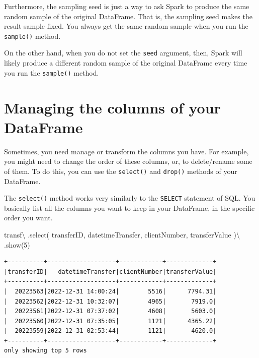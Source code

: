 \documentclass[
  11pt,
  letterpaper,
  DIV=11,
  numbers=noendperiod]{scrreprt}
\newenvironment{Shaded}{\begin{snugshade}}{\end{snugshade}}
\newcommand{\DecValTok}[1]{\textcolor[rgb]{0.68,0.00,0.00}{#1}}
\newcommand{\NormalTok}[1]{\textcolor[rgb]{0.00,0.23,0.31}{#1}}
\newcommand{\OperatorTok}[1]{\textcolor[rgb]{0.37,0.37,0.37}{#1}}
\newcommand{\StringTok}[1]{\textcolor[rgb]{0.13,0.47,0.30}{#1}}
\begin{document}
Furthermore, the sampling seed is just a way to ask Spark to produce the
same random sample of the original DataFrame. That is, the sampling seed
makes the result sample fixed. You always get the same random sample
when you run the \texttt{sample()} method.

On the other hand, when you do not set the \texttt{seed} argument, then,
Spark will likely produce a different random sample of the original
DataFrame every time you run the \texttt{sample()} method.

\hypertarget{managing-the-columns-of-your-dataframe}{%
\section{Managing the columns of your
DataFrame}\label{managing-the-columns-of-your-dataframe}}

Sometimes, you need manage or transform the columns you have. For
example, you might need to change the order of these columns, or, to
delete/rename some of them. To do this, you can use the
\texttt{select()} and \texttt{drop()} methods of your DataFrame.

The \texttt{select()} method works very similarly to the \texttt{SELECT}
statement of SQL. You basically list all the columns you want to keep in
your DataFrame, in the specific order you want.

\begin{Shaded}
\begin{Highlighting}[]
\NormalTok{transf}\OperatorTok{\textbackslash{}}
\NormalTok{  .select(}
    \StringTok{\textquotesingle{}transferID\textquotesingle{}}\NormalTok{, }\StringTok{\textquotesingle{}datetimeTransfer\textquotesingle{}}\NormalTok{,}
    \StringTok{\textquotesingle{}clientNumber\textquotesingle{}}\NormalTok{, }\StringTok{\textquotesingle{}transferValue\textquotesingle{}}
\NormalTok{  )}\OperatorTok{\textbackslash{}}
\NormalTok{  .show(}\DecValTok{5}\NormalTok{)}
\end{Highlighting}
\end{Shaded}

\begin{verbatim}
+----------+-------------------+------------+-------------+
|transferID|   datetimeTransfer|clientNumber|transferValue|
+----------+-------------------+------------+-------------+
|  20223563|2022-12-31 14:00:24|        5516|      7794.31|
|  20223562|2022-12-31 10:32:07|        4965|       7919.0|
|  20223561|2022-12-31 07:37:02|        4608|       5603.0|
|  20223560|2022-12-31 07:35:05|        1121|      4365.22|
|  20223559|2022-12-31 02:53:44|        1121|       4620.0|
+----------+-------------------+------------+-------------+
only showing top 5 rows
\end{verbatim}
\end{document}
